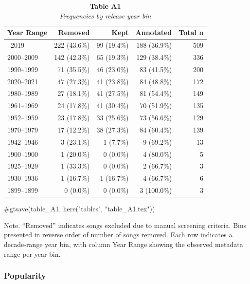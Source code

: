 \documentclass[
  man]{apa7}
\newenvironment{Shaded}{\begin{snugshade}}{\end{snugshade}}
\newcommand{\CommentTok}[1]{\textcolor[rgb]{0.37,0.37,0.37}{#1}}
\begin{document}
\begin{table}
\caption*{
{\large \textbf{Table A1}} \\ 
{\small \emph{Frequencies by release year bin}}
} 
\fontsize{12.0pt}{14.4pt}\selectfont
\begin{tabular*}{\linewidth}{@{\extracolsep{\fill}}lrrrr}
\toprule
{Year Range} & Removed & Kept & Annotated & Total n \\ 
\midrule\addlinespace[2.5pt]
2010–2019 & 222 (43.6\%) & 99 (19.4\%) & 188 (36.9\%) & 509 \\ 
2000–2009 & 142 (42.3\%) & 65 (19.3\%) & 129 (38.4\%) & 336 \\ 
1990–1999 & 71 (35.5\%) & 46 (23.0\%) & 83 (41.5\%) & 200 \\ 
2020–2021 & 47 (27.3\%) & 41 (23.8\%) & 84 (48.8\%) & 172 \\ 
1980–1989 & 27 (18.1\%) & 41 (27.5\%) & 81 (54.4\%) & 149 \\ 
1961–1969 & 24 (17.8\%) & 41 (30.4\%) & 70 (51.9\%) & 135 \\ 
1952–1959 & 23 (17.8\%) & 33 (25.6\%) & 73 (56.6\%) & 129 \\ 
1970–1979 & 17 (12.2\%) & 38 (27.3\%) & 84 (60.4\%) & 139 \\ 
1942–1946 & 3 (23.1\%) & 1 (7.7\%) & 9 (69.2\%) & 13 \\ 
1900–1900 & 1 (20.0\%) & 0 (0.0\%) & 4 (80.0\%) & 5 \\ 
1925–1929 & 1 (33.3\%) & 0 (0.0\%) & 2 (66.7\%) & 3 \\ 
1930–1936 & 1 (16.7\%) & 1 (16.7\%) & 4 (66.7\%) & 6 \\ 
1899–1899 & 0 (0.0\%) & 0 (0.0\%) & 3 (100.0\%) & 3 \\ 
\bottomrule
\end{tabular*}
\end{table}

\begin{Shaded}
\begin{Highlighting}[]
\CommentTok{\#gtsave(table\_A1, here("tables", "table\_A1.tex"))}
\end{Highlighting}
\end{Shaded}

{Note. ``Removed'' indicates songs excluded due to manual screening
criteria. Bins presented in reverse order of number of songs removed.
Each row indicates a decade-range year bin, with column Year Range
showing the observed metadata range per year bin.}

\subsubsection{Popularity}\label{popularity}
\end{document}
